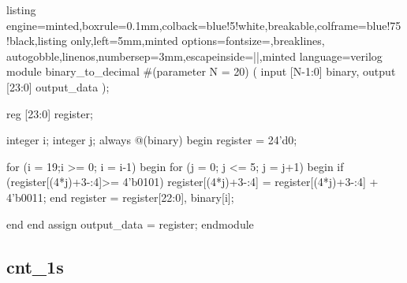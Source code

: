 \documentclass[a4paper]{article}
\begin{document}
\begin{tcblisting}{listing engine=minted,boxrule=0.1mm,colback=blue!5!white,breakable,colframe=blue!75!black,listing only,left=5mm,minted options={fontsize=\small,breaklines, autogobble,linenos,numbersep=3mm,escapeinside=||},minted language=verilog}
module binary_to_decimal #(parameter N = 20)
(
    input [N-1:0] binary,
    output [23:0] output_data
    );

    reg [23:0] register;

integer i;
integer j;
    always @(binary) begin
        register = 24'd0;

        for (i = 19;i >= 0; i = i-1) begin
            for (j = 0; j <= 5; j = j+1) begin
                if (register[(4*j)+3-:4]>= 4'b0101) register[(4*j)+3-:4] = register[(4*j)+3-:4] + 4'b0011;
            end
            register = {register[22:0], binary[i]};

        end
    end
    assign output_data = register;
endmodule
\end{tcblisting}

\subsection*{cnt\_1s}




\end{document}
